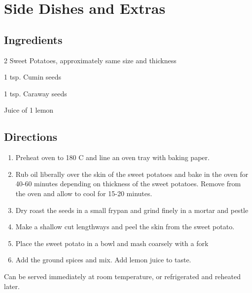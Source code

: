 \chapter{Side Dishes and Extras}



\section*{Ingredients}
\begin{ingredients-list}
	\item 2 Sweet Potatoes, approximately same size and thickness
	\item 1 tsp. Cumin seeds
	\item 1 tsp. Caraway seeds
	\item Juice of 1 lemon
\end{ingredients-list}

\section*{Directions}
\begin{enumerate}
	\item Preheat oven to 180 C and line an oven tray with baking paper.
	\item Rub oil liberally over the skin of the sweet potatoes and bake in the oven for 40-60 minutes
		depending on thickness of the sweet potatoes.
	 Remove from the oven and allow to cool for 15-20 minutes.
	\item Dry roast the seeds in a small frypan and grind finely in a mortar and pestle
	\item Make a shallow cut lengthways and peel the skin from the sweet potato.
	\item Place the sweet potato in a bowl and mash coarsely with a fork
	\item  Add the ground spices and mix. Add lemon juice to taste.
\end{enumerate}
Can be served immediately at room temperature, or refrigerated and reheated later.




